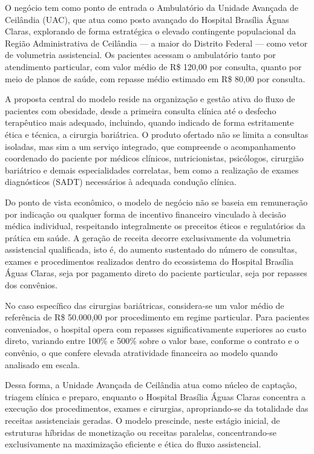 \documentclass[12pt]{article}
\begin{document}
O negócio tem como ponto de entrada o Ambulatório da Unidade Avançada de Ceilândia (UAC), que atua como posto avançado do Hospital Brasília Águas Claras, explorando de forma estratégica o elevado contingente populacional da Região Administrativa de Ceilândia — a maior do Distrito Federal — como vetor de volumetria assistencial. Os pacientes acessam o ambulatório tanto por atendimento particular, com valor médio de R\$ 120,00 por consulta, quanto por meio de planos de saúde, com repasse médio estimado em R\$ 80,00 por consulta.

A proposta central do modelo reside na organização e gestão ativa do fluxo de pacientes com obesidade, desde a primeira consulta clínica até o desfecho terapêutico mais adequado, incluindo, quando indicado de forma estritamente ética e técnica, a cirurgia bariátrica. O produto ofertado não se limita a consultas isoladas, mas sim a um serviço integrado, que compreende o acompanhamento coordenado do paciente por médicos clínicos, nutricionistas, psicólogos, cirurgião bariátrico e demais especialidades correlatas, bem como a realização de exames diagnósticos (SADT) necessários à adequada condução clínica.

Do ponto de vista econômico, o modelo de negócio não se baseia em remuneração por indicação ou qualquer forma de incentivo financeiro vinculado à decisão médica individual, respeitando integralmente os preceitos éticos e regulatórios da prática em saúde. A geração de receita decorre exclusivamente da volumetria assistencial qualificada, isto é, do aumento sustentado do número de consultas, exames e procedimentos realizados dentro do ecossistema do Hospital Brasília Águas Claras, seja por pagamento direto do paciente particular, seja por repasses dos convênios.

No caso específico das cirurgias bariátricas, considera-se um valor médio de referência de R\$ 50.000,00 por procedimento em regime particular. Para pacientes conveniados, o hospital opera com repasses significativamente superiores ao custo direto, variando entre 100\% e 500\% sobre o valor base, conforme o contrato e o convênio, o que confere elevada atratividade financeira ao modelo quando analisado em escala.

Dessa forma, a Unidade Avançada de Ceilândia atua como núcleo de captação, triagem clínica e preparo, enquanto o Hospital Brasília Águas Claras concentra a execução dos procedimentos, exames e cirurgias, apropriando-se da totalidade das receitas assistenciais geradas. O modelo prescinde, neste estágio inicial, de estruturas híbridas de monetização ou receitas paralelas, concentrando-se exclusivamente na maximização eficiente e ética do fluxo assistencial.
\end{document}
